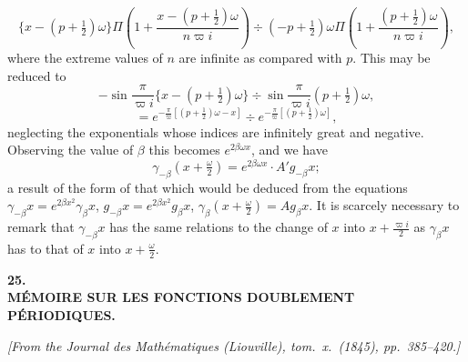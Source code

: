 \documentclass[12pt,a4paper]{article}
\begin{document}
\[
\{x - (p+\tfrac12)\omega\}\Pi\!\left(1 + \frac{x - (p+\tfrac12)\omega}{n\varpi i}\right) \div (-p+\tfrac12)\omega\Pi\!\left(1 + \frac{(p+\tfrac12)\omega}{n\varpi i}\right),
\]
where the extreme values of $n$ are infinite as compared with $p$. This may be reduced to
\[
-\sin\frac{\pi}{\varpi i}\{x - (p+\tfrac12)\omega\} \div \sin\frac{\pi}{\varpi i}(p+\tfrac12)\omega,
\]
\[
= e^{-\frac{\pi}{\varpi}[(p+\frac12)\omega - x]} \div e^{-\frac{\pi}{\varpi}[(p+\frac12)\omega]},
\]
neglecting the exponentials whose indices are infinitely great and negative. Observing the value of $\beta$ this becomes $e^{2\beta\omega x}$, and we have
\[
\gamma_{-\beta}\!\left(x + \tfrac{\omega}{2}\right) = e^{2\beta\omega x} \cdot A' g_{-\beta} x;
\]
a result of the form of that which would be deduced from the equations $\gamma_{-\beta} x = e^{2\beta x^2}\gamma_\beta x$, $g_{-\beta} x = e^{2\beta x^2} g_\beta x$, $\gamma_\beta\!\left(x+\tfrac{\omega}{2}\right) = A g_\beta x$. It is scarcely necessary to remark that $\gamma_{-\beta} x$ has the same relations to the change of $x$ into $x + \tfrac{\varpi i}{2}$ as $\gamma_\beta x$ has to that of $x$ into $x + \tfrac{\omega}{2}$.

\newpage
\setcounter{page}{156}


\begin{center}
\textbf{\Large 25.}\\[1em]
\textbf{\large M\'EMOIRE SUR LES FONCTIONS DOUBLEMENT P\'ERIODIQUES.}
\end{center}

\textit{[From the Journal des Math\'ematiques (Liouville), tom.~x.~(1845), pp.~385--420.]}

\bigskip
\end{document}
